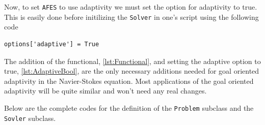     Now, to set \texttt{AFES} to use adaptivity we must set the option for
    adaptivity to true. This is easily done before initilizing the
    \texttt{Solver} in one's script using the following code
    \begin{lstlisting}[label={lst:AdaptiveBool},
                       caption={Setting the the adaptive boolean to true.}]
        options['adaptive'] = True
    \end{lstlisting}

    The addition of the functional, \autoref{lst:Functional}, and setting the
    adaptive option to true, \autoref{lst:AdaptiveBool}, are the only necessary
    additions needed for goal oriented adaptivity in the Navier-Stokes equation.
    Most applications of the goal oriented adaptivity will be quite similar and
    won't need any real changes.

    Below are the complete codes for the definition of the \texttt{Problem}
    subclass and the \texttt{Sovler} subclass.
    

    

